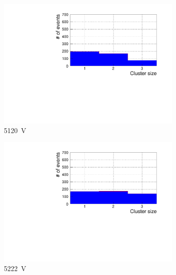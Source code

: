 	\begin{figure}[H]
		\begin{subfigure}{.33\linewidth}
		    \centering
			\includegraphics[width=1.1\linewidth]{fig/chapt6/Muon-ClS-1D-5000-gRPC-INFN.pdf}
			\caption{\label{fig:cluster-size-1D:A} \SI{5120}{V}}
		\end{subfigure}
		\begin{subfigure}{.33\linewidth}
		    \centering
			\includegraphics[width=1.1\linewidth]{fig/chapt6/Muon-ClS-1D-5100-gRPC-INFN.pdf}
			\caption{\label{fig:cluster-size-1D:B} \SI{5222}{V}}
		\end{subfigure}
		\begin{subfigure}{.33\linewidth}
		    \centering

\end{subfigure}
\end{figure}
